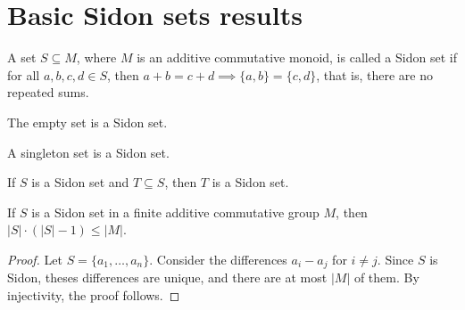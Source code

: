 %

\chapter{Basic Sidon sets results}

\begin{definition}\leanok\label{def:sidon_set}
    A set $S \subseteq M$, where $M$ is an additive commutative monoid, is called a Sidon set if for all $a, b, c, d \in S$, then $a + b = c + d \implies \{a, b\} = \{c, d\}$, that is, there are no repeated sums.
\end{definition}

\begin{theorem}\leanok{}
    The empty set is a Sidon set.
\end{theorem}

\begin{theorem}\leanok{}
    A singleton set is a Sidon set.
\end{theorem}

\begin{theorem}\leanok{}
    If $S$ is a Sidon set and $T \subseteq S$, then $T$ is a Sidon set.
\end{theorem}

\begin{theorem}\leanok{}
    If $S$ is a Sidon set in a finite additive commutative group $M$, then $|S| \cdot (|S| - 1) \leq |M|$.
\end{theorem}
\begin{proof}
    Let $S = \{a_1, \ldots, a_n\}$. Consider the differences $a_i - a_j$ for $i \neq j$.
    Since $S$ is Sidon, theses differences are unique, and there are at most $|M|$ of them.
    By injectivity, the proof follows.
\end{proof}
